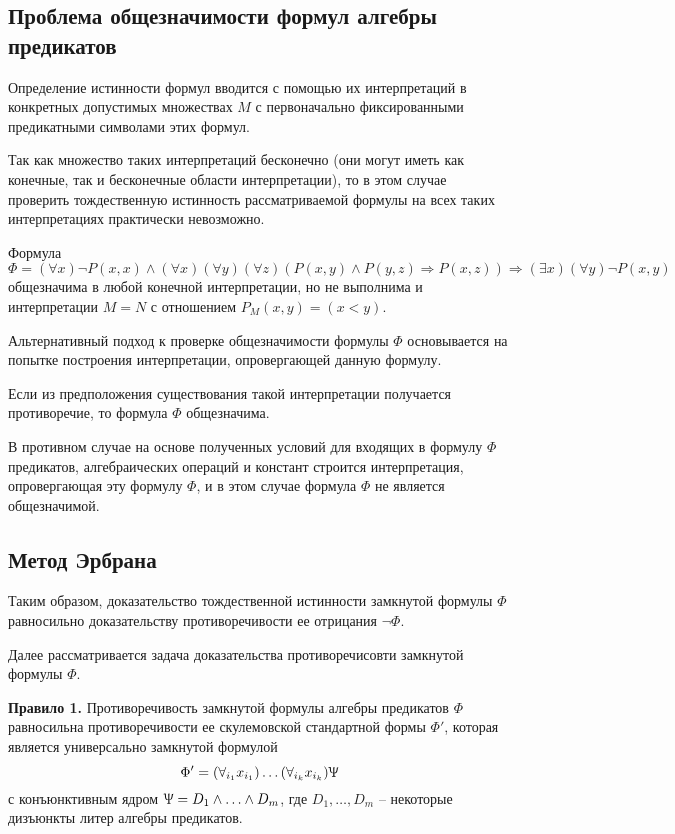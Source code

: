 \subsection*{Проблема общезначимости формул алгебры предикатов}
Определение истинности формул вводится с помощью их интерпретаций в конкретных допустимых множествах $M$ с первоначально 
фиксированными предикатными символами этих формул. 

Так как множество таких интерпретаций бесконечно (они могут иметь как конечные, так и бесконечные области интерпретации), то в этом случае  проверить тождественную истинность рассматриваемой формулы на всех таких 
интерпретациях практически невозможно.

\begin{example}
    Формула 
    $$\Phi = (\forall x)\lnot P(x,x)\land(\forall x)(\forall y)(\forall z)(P(x,y)\land P(y,z)\Rightarrow P(x,z))\Rightarrow(\exists x)(\forall y)\lnot P(x,y)$$
    общезначима в любой конечной интерпретации, но не выполнима и интерпретации $M=N$ с отношением $P_M(x,y) = (x < y)$.
\end{example}

Альтернативный подход к проверке общезначимости 
формулы $\Phi$ основывается на попытке построения 
интерпретации, опровергающей данную формулу. 

Если из предположения существования такой 
интерпретации получается противоречие, то формула 
$\Phi$ общезначима. 

В противном случае на основе 
полученных условий для входящих в формулу $\Phi$
предикатов, алгебраических операций и констант 
строится интерпретация, опровергающая эту формулу 
$\Phi$, и в этом случае формула $\Phi$ не является 
общезначимой. 

\subsection*{Метод Эрбрана}

Таким образом, доказательство тождественной истинности замкнутой формулы $\Phi$ равносильно доказательству противоречивости ее отрицания $\lnot \Phi$.

Далее рассматривается задача доказательства противоречисовти замкнутой формулы $\Phi$.

\textbf{Правило 1.} Противоречивость замкнутой формулы алгебры предикатов $\Phi$ равносильна противоречивости ее скулемовской стандартной формы $\Phi'$, которая является универсально замкнутой формулой
$$\Phi'=(\forall_{i_1}x_{i_1})\ldots(\forall_{i_k}x_{i_k})\Uppsi$$
с конъюнктивным ядром $\Uppsi=D_1\land\ldots\land D_m$, где $D_1,\ldots,D_m$ -- некоторые дизъюнкты литер алгебры предикатов.

